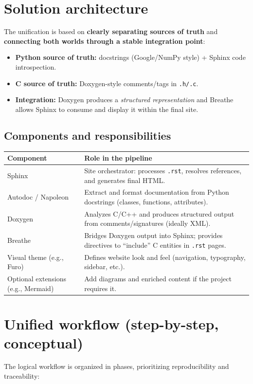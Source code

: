 \documentclass[11pt,a4paper]{article}
\begin{document}
\section{Solution architecture}
The unification is based on \textbf{clearly separating sources of truth} and \textbf{connecting both worlds through a stable integration point}:

\begin{itemize}[leftmargin=*,itemsep=2pt]
  \item \textbf{Python source of truth:} docstrings (Google/NumPy style) + Sphinx code introspection.
  \item \textbf{C source of truth:} Doxygen-style comments/tags in \texttt{.h/.c}.
  \item \textbf{Integration:} Doxygen produces a \textit{structured representation} and Breathe allows Sphinx to consume and display it within the final site.
\end{itemize}

\subsection{Components and responsibilities}
\begin{table}[h]
\centering
\begin{tabular}{@{}p{3.3cm}p{10.5cm}@{}}
\toprule
\textbf{Component} & \textbf{Role in the pipeline} \\
\midrule
Sphinx & Site orchestrator: processes \texttt{.rst}, resolves references, and generates final HTML. \\
Autodoc / Napoleon & Extract and format documentation from Python docstrings (classes, functions, attributes). \\
Doxygen & Analyzes C/C++ and produces structured output from comments/signatures (ideally XML). \\
Breathe & Bridges Doxygen output into Sphinx; provides directives to “include” C entities in \texttt{.rst} pages. \\
Visual theme (e.g., Furo) & Defines website look and feel (navigation, typography, sidebar, etc.). \\
Optional extensions (e.g., Mermaid) & Add diagrams and enriched content if the project requires it. \\
\bottomrule
\end{tabular}
\end{table}

\section{Unified workflow (step-by-step, conceptual)}
The logical workflow is organized in phases, prioritizing reproducibility and traceability:
\end{document}
